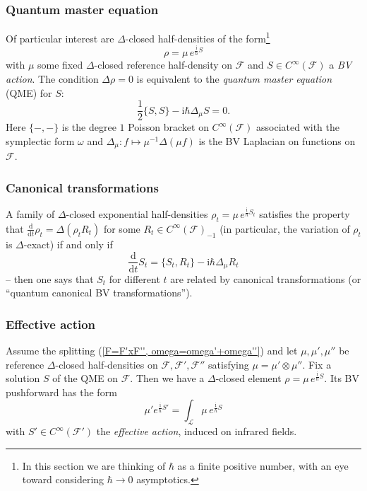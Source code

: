 \documentclass{amsart}
\theoremstyle{plain} %
\theoremstyle{definition}
\theoremstyle{remark}
\newcommand{\ra}{\rightarrow}
\newcommand{\F}{\mathcal{F}}
\newcommand{\LL}{\mathcal{L}}
\newcommand{\iii}{\mathrm{i}}
\newcommand{\ddd}{\mathrm{d}}
\begin{document}
\subsubsection{Quantum master equation} Of particular interest are $\Delta$-closed half-densities of the form\footnote{In this section we are thinking of $\hbar$ as a finite positive number, with an eye toward considering $\hbar\ra 0$ asymptotics.} 
\begin{equation}
\rho=\mu\, e^{\frac{\iii}{\hbar}S}
\end{equation}
with $\mu$ some fixed $\Delta$-closed reference half-density on $\F$ and $S\in C^\infty(\F)$ a \emph{BV action}. 
The condition $\Delta\rho=0$ is equivalent to the \emph{quantum master equation} (QME) for $S$:
\begin{equation}\label{QME}
    \frac12\{S,S\} - \iii\hbar \Delta_\mu S=0.
\end{equation}
Here $\{-,-\}$ is the degree $1$ Poisson bracket on $C^\infty(\F)$ associated with the symplectic form $\omega$ and $\Delta_\mu\colon f\mapsto \mu^{-1} \Delta(\mu f)$ is the BV Laplacian on functions on $\F$.

\subsubsection{Canonical transformations} A family of $\Delta$-closed exponential half-densities $\rho_t=\mu\, e^{\frac{\iii}{\hbar}S_t}$ satisfies the property that $\frac{\ddd}{\ddd t}\rho_t= \Delta(\rho_t R_t)$ for some $R_t\in C^\infty(\F)_{-1}$ (in particular, the variation of $\rho_t$ is $\Delta$-exact) if and only if
\begin{equation}\label{infinitesimal canonical transformation}
    \frac{\ddd}{\ddd t} S_t=\{S_t,R_t\}-\iii\hbar \Delta_\mu R_t
\end{equation}
-- then one says that $S_{t}$ for different $t$ are related by canonical transformations (or ``quantum canonical BV transformations'').

\subsubsection{Effective action}
Assume the splitting (\ref{F=F'xF'', omega=omega'+omega''}) and let $\mu,\mu',\mu''$ be reference $\Delta$-closed half-densities on $\F,\F',\F''$ satisfying $\mu=\mu'\otimes\mu''$.
Fix a solution $S$ of the QME on $\F$. Then we have a $\Delta$-closed element $\rho=\mu \, e^{\frac{\iii}{\hbar}S}$. Its BV pushforward has the form
\begin{equation}\label{S' definition via BV pushforward}
    \mu' e^{\frac{\iii}{\hbar}S'}=\int_\LL \mu\, e^{\frac{\iii}{\hbar}S}
\end{equation}
with $S'\in C^\infty(\F')$ the \emph{effective action}, induced on infrared fields. 
\end{document}
